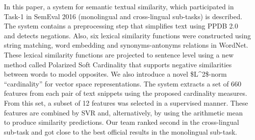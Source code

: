 In this paper, a system for semantic textual similarity, which participated in Task-1 in SemEval 2016 (monolingual and cross-lingual sub-tasks) is described. The system contains a preprocessing step that simplifies text using PPDB 2.0 and detects negations. Also, six lexical similarity functions were constructed using string matching, word embedding and synonyms-antonyms relations in WordNet. These lexical similarity functions are projected to sentence level using a new method called Polarized Soft Cardinality that supports negative similarities between words to model opposites. We also introduce a novel \$L^{2}\$-norm ``cardinality'' for vector space representations. The system extracts a set of 660 features from each pair of text snippets using the proposed cardinality measures. From this set, a subset of 12 features was selected in a supervised manner. These features are combined by SVR and, alternatively, by using the arithmetic mean to produce similarity predictions. Our team ranked second in the cross-lingual sub-task and got close to the best official results in the monolingual sub-task.
